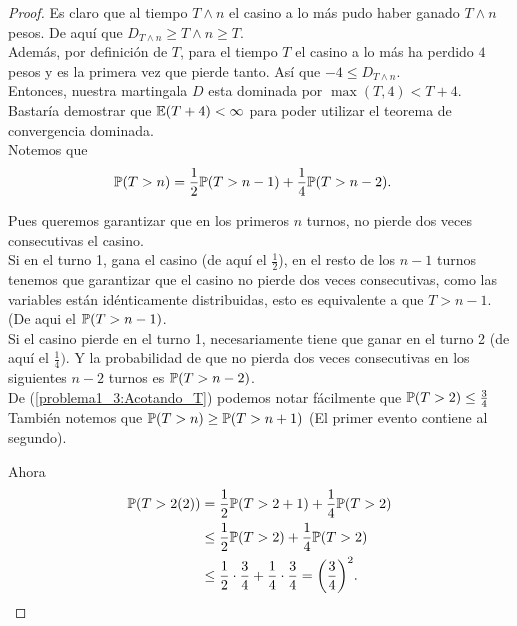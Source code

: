 \begin{proof}
		    Es claro que al tiempo $T \wedge n$ el casino a lo más pudo haber ganado $T \wedge n$ pesos.
		    De aquí que $D_{T \wedge n} \geq T \wedge n \geq T$.\\
		    
		    Además, por definición de $T$, para el tiempo $T$ el casino a lo más ha perdido $4$ pesos y es la primera vez que 
		    pierde tanto. Así que $-4 \leq D_{T \wedge n}$.\\ 
		    
			Entonces, nuestra martingala $D$ esta dominada por $\max(T, 4) < T + 4$. Bastaría demostrar que $\mathbb{E}(T+4) < \infty$ para poder
			utilizar el teorema de convergencia dominada.\\
			
			Notemos que 
			\begin{align}\label{problema1_3:Acotando_T}
				\mathbb{P}(T > n) &= \frac{1}{2} \mathbb{P}(T > n-1) + \frac{1}{4} \mathbb{P}(T > n-2). 
			\end{align}
			
			Pues queremos garantizar que en los primeros $n$ turnos, no pierde dos veces consecutivas el casino.\\
			
			Si en el turno 1, gana el casino (de aquí el $\frac{1}{2}$), en el resto de los $n-1$ turnos tenemos que garantizar que 
			el casino no pierde dos veces consecutivas, como las variables están idénticamente distribuidas, esto es equivalente a que
			$T>n-1$. (De aqui el $\mathbb{P}(T > n-1)$.\\
			
			Si el casino pierde en el turno 1, necesariamente tiene que ganar en el turno 2 (de aquí el $\frac{1}{4})$. Y la probabilidad
			de que no pierda dos veces consecutivas en los siguientes $n-2$ turnos es $\mathbb{P}(T > n-2)$.\\					    
		    
		    De (\ref{problema1_3:Acotando_T}) podemos notar fácilmente que $\mathbb{P}(T > 2) \leq \frac{3}{4}$\\
		    
		    También notemos que $\mathbb{P}(T > n ) \geq \mathbb{P}(T > n + 1)$ (El primer evento contiene al segundo).
		    
		    Ahora
		    \begin{align}
		       	\mathbb{P}(T > 2 (2)) &=     \frac{1}{2} \mathbb{P}(T > 2+1) + \frac{1}{4} \mathbb{P}(T > 2) \\
		       				   &\leq  \frac{1}{2} \mathbb{P}(T > 2) + \frac{1}{4} \mathbb{P}(T > 2) \\
		       				   &\leq  \frac{1}{2} \cdot \frac{3}{4} + \frac{1}{4} \cdot \frac{3}{4} = \bigg(\frac{3}{4}\bigg)^2.
		    \end{align}
		    

\end{proof}
